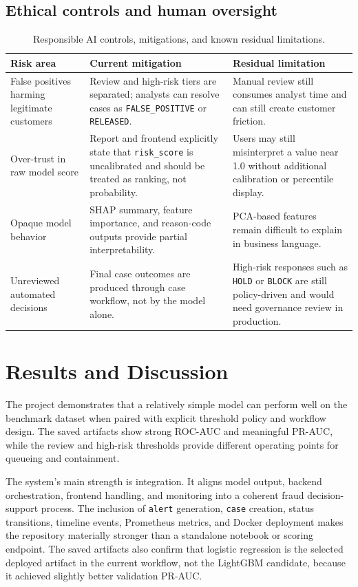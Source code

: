 \documentclass[11pt]{article}
\newcommand{\code}[1]{\texttt{#1}}
\begin{document}
\subsection*{Ethical controls and human oversight}
\begin{table}[H]
\small
\centering
\begin{tabularx}{\textwidth}{p{}p{}X}
\toprule
Risk area & Current mitigation & Residual limitation \\
\midrule
False positives harming legitimate customers & Review and high-risk tiers are separated; analysts can resolve cases as \code{FALSE\_POSITIVE} or \code{RELEASED}. & Manual review still consumes analyst time and can still create customer friction. \\
Over-trust in raw model score & Report and frontend explicitly state that \code{risk\_score} is uncalibrated and should be treated as ranking, not probability. & Users may still misinterpret a value near 1.0 without additional calibration or percentile display. \\
Opaque model behavior & SHAP summary, feature importance, and reason-code outputs provide partial interpretability. & PCA-based features remain difficult to explain in business language. \\
Unreviewed automated decisions & Final case outcomes are produced through case workflow, not by the model alone. & High-risk responses such as \code{HOLD} or \code{BLOCK} are still policy-driven and would need governance review in production. \\
\bottomrule
\end{tabularx}
\caption{Responsible AI controls, mitigations, and known residual limitations.}
\end{table}

\section{Results and Discussion}
The project demonstrates that a relatively simple model can perform well on the benchmark dataset when paired with explicit threshold policy and workflow design. The saved artifacts show strong ROC-AUC and meaningful PR-AUC, while the review and high-risk thresholds provide different operating points for queueing and containment.

The system's main strength is integration. It aligns model output, backend orchestration, frontend handling, and monitoring into a coherent fraud decision-support process. The inclusion of \code{alert} generation, \code{case} creation, status transitions, timeline events, Prometheus metrics, and Docker deployment makes the repository materially stronger than a standalone notebook or scoring endpoint. The saved artifacts also confirm that logistic regression is the selected deployed artifact in the current workflow, not the LightGBM candidate, because it achieved slightly better validation PR-AUC.
\end{document}
